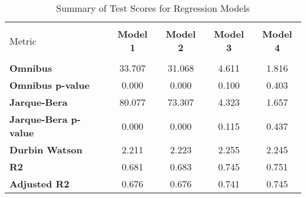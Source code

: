 
    \begin{table}
        \centering
        \caption{Summary of Test Scores for Regression Models}
        \vspace{10pt}
        \label{tab:test_scores}
        \begin{tabular}{lcccc}
        \hline
        \hline \\[-1.8ex]
    Metric & \textbf{Model 1} & \textbf{Model 2} & \textbf{Model 3} & \textbf{Model 4} \\
\hline \\[-1.8ex] 
\textbf{Omnibus} & 33.707 & 31.068 & 4.611 & 1.816 \\
\textbf{Omnibus p-value} & 0.000 & 0.000 & 0.100 & 0.403 \\
\textbf{Jarque-Bera} & 80.077 & 73.307 & 4.323 & 1.657 \\
\textbf{Jarque-Bera p-value} & 0.000 & 0.000 & 0.115 & 0.437 \\
\textbf{Durbin Watson} & 2.211 & 2.223 & 2.255 & 2.245 \\
\textbf{R2} & 0.681 & 0.683 & 0.745 & 0.751 \\
\textbf{Adjusted R2} & 0.676 & 0.676 & 0.741 & 0.745 \\

        \hline
        \hline
        \end{tabular}
    \end{table}
    